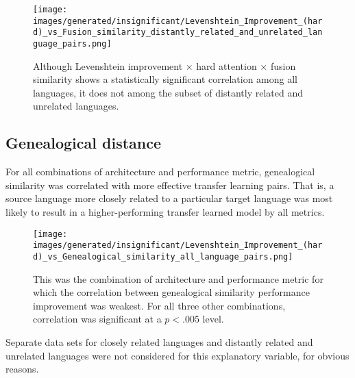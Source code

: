 \begin{figure}[ht]
\texttt{[image: images/generated/insignificant/Levenshtein\_Improvement\_(hard)\_vs\_Fusion\_similarity\_distantly\_related\_and\_unrelated\_language\_pairs.png]}
\centering
\caption{Although Levenshtein improvement $\times$ hard attention $\times$ fusion similarity shows a statistically significant correlation among all languages, it does not among the subset of distantly related and unrelated languages.}
\end{figure}

\subsection{Genealogical distance}

For all combinations of architecture and performance metric, genealogical similarity was correlated with more effective transfer learning pairs. That is, a source language more closely related to a particular target language was most likely to result in a higher-performing transfer learned model by all metrics.

\begin{figure}[ht]
\texttt{[image: images/generated/insignificant/Levenshtein\_Improvement\_(hard)\_vs\_Genealogical\_similarity\_all\_language\_pairs.png]}
\centering
\caption{This was the combination of architecture and performance metric for which the correlation between genealogical similarity performance improvement was weakest. For all three other combinations, correlation was significant at a $p<.005$ level.}
\end{figure}

Separate data sets for closely related languages and distantly related and unrelated languages were not considered for this explanatory variable, for obvious reasons.